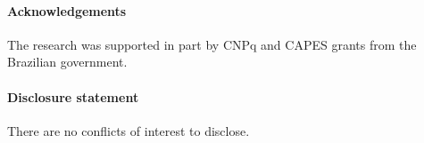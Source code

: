 \documentclass[12pt]{article}
\theoremstyle{definition}
\begin{document}


\paragraph*{Acknowledgements}
The research was supported in part by CNPq and CAPES grants from the Brazilian government.

\paragraph*{Disclosure statement}
There are no conflicts of interest to disclose.







%

%	
\end{document}
